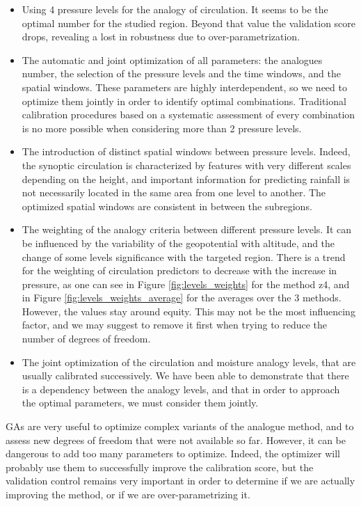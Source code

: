\documentclass{ametsoc}
\begin{document}
\begin{itemize}
	\item Using 4 pressure levels for the analogy of circulation. It seems to be the optimal number for the studied region. Beyond that value the validation score drops, revealing a lost in robustness due to over-parametrization.
	\item The automatic and joint optimization of all parameters: the analogues number, the selection of the pressure levels and the time windows, and the spatial windows. These parameters are highly interdependent, so we need to optimize them jointly in order to identify optimal combinations. Traditional calibration procedures based on a systematic assessment of every combination is no more possible when considering more than 2 pressure levels.
	\item The introduction of distinct spatial windows between pressure levels. Indeed, the synoptic circulation is characterized by features with very different scales depending on the height, and important information for predicting rainfall is not necessarily located in the same area from one level to another. The optimized spatial windows are consistent in between the subregions.
	\item The weighting of the analogy criteria between different pressure levels. It can be influenced by the variability of the geopotential with altitude, and the change of some levels significance with the targeted region. There is a trend for the weighting of circulation predictors to decrease with the increase in pressure, as one can see in Figure \ref{fig:levels_weights} for the method z4, and in Figure \ref{fig:levels_weights_average} for the averages over the 3 methods. However, the values stay around equity. This may not be the most influencing factor, and we may suggest to remove it first when trying to reduce the number of degrees of freedom.
	\item The joint optimization of the circulation and moisture analogy levels, that are usually calibrated successively. We have been able to demonstrate that there is a dependency between the analogy levels, and that in order to approach the optimal parameters, we must consider them jointly.
\end{itemize}
	
GAs are very useful to optimize complex variants of the analogue method, and to assess new degrees of freedom that were not available so far. However, it can be dangerous to add too many parameters to optimize. Indeed, the optimizer will probably use them to successfully improve the calibration score, but the validation control remains very important in order to determine if we are actually improving the method, or if we are over-parametrizing it.
\end{document}
